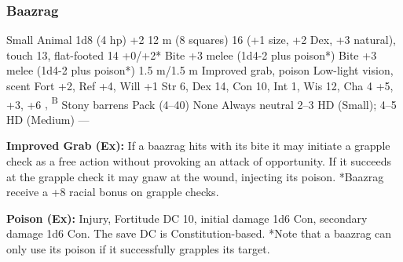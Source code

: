 \subsubsection{Baazrag}
\begin{MonsterStats}
{Small Animal}
{1d8 (4 hp)}
{+2}
{12 m (8 squares)}
{16 (+1 size, +2 Dex, +3 natural), touch 13, flat-footed 14}
{+0/+2*}
{Bite +3 melee (1d4-2 plus poison*)}
{Bite +3 melee (1d4-2 plus poison*)}
{1.5 m/1.5 m}
{Improved grab, poison}
{Low-light vision, scent}
{Fort +2, Ref +4, Will +1}
{Str 6, Dex 14, Con 10, Int 1, Wis 12, Cha 4}
{ +5,  +3,  +6}
{, \textsuperscript{B}}
{Stony barrens}
{Pack (4--40)}
{\onehalf}
{None}
{Always neutral}
{2--3 HD (Small); 4--5 HD (Medium)}
{---}
\end{MonsterStats}

\textbf{Improved Grab (Ex):} If a baazrag hits with its bite it may initiate a grapple check as a free action without provoking an attack of opportunity. If it succeeds at the grapple check it may gnaw at the wound, injecting its poison. *Baazrag receive a +8 racial bonus on grapple checks.

\textbf{Poison (Ex):} Injury, Fortitude DC 10, initial damage 1d6 Con, secondary damage 1d6 Con. The save DC is Constitution-based. *Note that a baazrag can only use its poison if it successfully grapples its target.
